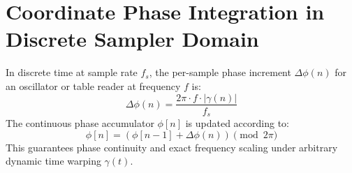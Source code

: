 \documentclass[11pt,a4paper]{article}
\begin{document}
\section{Coordinate Phase Integration in Discrete Sampler Domain}
In discrete time at sample rate $f_s$, the per-sample phase increment $\Delta \phi(n)$ for an oscillator or table reader at frequency $f$ is:
\begin{equation}
\Delta \phi(n) = \frac{2\pi \cdot f \cdot |\gamma(n)|}{f_s}
\end{equation}
The continuous phase accumulator $\phi[n]$ is updated according to:
\begin{equation}
\phi[n] = \left( \phi[n-1] + \Delta \phi(n) \right) \pmod{2\pi}
\end{equation}
This guarantees phase continuity and exact frequency scaling under arbitrary dynamic time warping $\gamma(t)$.
\end{document}
